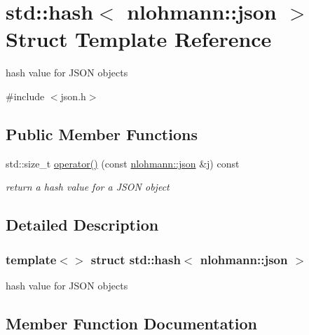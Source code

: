 \hypertarget{structstd_1_1hash_3_01nlohmann_1_1json_01_4}{}\section{std\+:\+:hash$<$ nlohmann\+:\+:json $>$ Struct Template Reference}
\label{structstd_1_1hash_3_01nlohmann_1_1json_01_4}


hash value for J\+S\+ON objects  




{\ttfamily \#include $<$json.\+h$>$}

\subsection*{Public Member Functions}
\begin{DoxyCompactItemize}
\item 
std\+::size\+\_\+t \hyperlink{structstd_1_1hash_3_01nlohmann_1_1json_01_4_aec1567d1fa47dbe5b77954dce3a55b64}{operator()} (const \hyperlink{namespacenlohmann_a2bfd99e845a2e5cd90aeaf1b1431f474}{nlohmann\+::json} \&j) const
\begin{DoxyCompactList}\small\item\em return a hash value for a J\+S\+ON object \end{DoxyCompactList}\end{DoxyCompactItemize}


\subsection{Detailed Description}
\subsubsection*{template$<$$>$\newline
struct std\+::hash$<$ nlohmann\+::json $>$}

hash value for J\+S\+ON objects 

\subsection{Member Function Documentation}
\mbox{\label{structstd_1_1hash_3_01nlohmann_1_1json_01_4_aec1567d1fa47dbe5b77954dce3a55b64}} 
